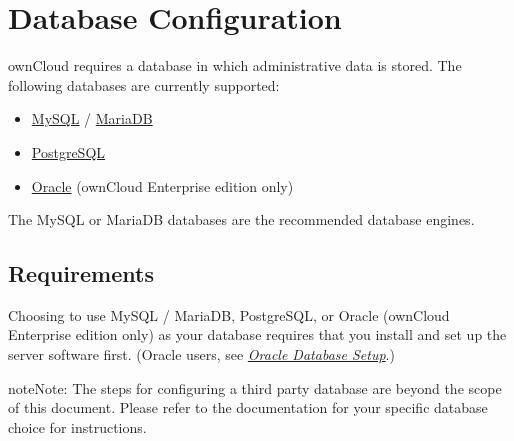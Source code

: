 \documentclass[letterpaper,10pt,english]{sphinxmanual}
\begin{document}
\section{Database Configuration}
\label{configuration_database/linux_database_configuration:database-configuration}\label{configuration_database/linux_database_configuration::doc}
ownCloud requires a database in which administrative data is stored. The following databases are currently supported:
\begin{itemize}
\item {} 
\href{http://www.mysql.com/}{MySQL} / \href{https://mariadb.org/}{MariaDB}

\item {} 
\href{http://www.postgresql.org/}{PostgreSQL}

\item {} 
\href{http://www.oracle.com/}{Oracle} (ownCloud Enterprise edition only)

\end{itemize}

The MySQL or MariaDB databases are the recommended database engines.


\subsection{Requirements}
\label{configuration_database/linux_database_configuration:requirements}
Choosing to use MySQL / MariaDB, PostgreSQL, or Oracle (ownCloud Enterprise
edition only) as your database requires that you install and set up the server
software first.
(Oracle users, see {\hyperref[enterprise_installation/oracle_db_configuration::doc]{\emph{Oracle Database Setup}}}.)

\begin{notice}{note}{Note:}
The steps for configuring a third party database are beyond the scope of this document.  Please refer to the documentation for your specific database choice for instructions.
\end{notice}
\end{document}
